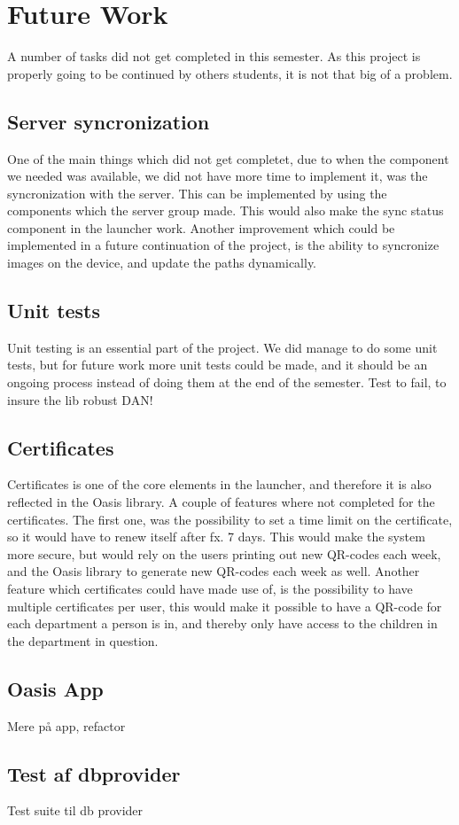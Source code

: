 \section{Future Work}

A number of tasks did not get completed in this semester. As this project is properly going to be continued by others students, it is not that big of a problem. 

\subsection{Server syncronization}
One of the main things which did not get completet, due to when the component we needed was available, we did not have more time to implement it, was the syncronization with the server. This can be implemented by using the components which the server group made. This would also make the sync status component in the launcher work.
Another improvement which could be implemented in a future continuation of the project, is the ability to syncronize images on the device, and update the paths dynamically.

\subsection{Unit tests}
Unit testing is an essential part of the project. We did manage to do some unit tests, but for future work more unit tests could be made, and it should be an ongoing process instead of doing them at the end of the semester.
Test to fail, to insure the lib robust DAN!

\subsection{Certificates}
Certificates is one of the core elements in the launcher, and therefore it is also reflected in the Oasis library. A couple of features where not completed for the certificates. The first one, was the possibility to set a time limit on the certificate, so it would have to renew itself after fx. 7 days. This would make the system more secure, but would rely on the users printing out new QR-codes each week, and the Oasis library to generate new QR-codes each week as well.
Another feature which certificates could have made use of, is the possibility to have multiple certificates per user, this would make it possible to have a QR-code for each department a person is in, and thereby only have access to the children in the department in question.

\subsection{Oasis App}

Mere p\aa{} app, refactor


\subsection{Test af dbprovider}
Test suite til db provider